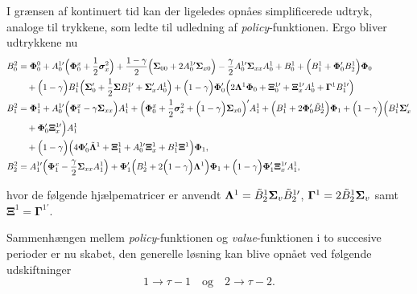 \documentclass[
  a4paper,
  oneside]{memoir}
\begin{document}
I grænsen af kontinuert tid kan der ligeledes opnåes simplificerede udtryk, analoge til trykkene, som ledte til udledning af \emph{policy}-funktionen. Ergo bliver udtrykkene nu
\begin{align*}
B_0^2&=\bm{\Phi}_0^0 + A_0^{1\prime} \Big(\bm{\Phi}_0^x + \frac{1}{2}\bm{\sigma}_x^2\Big) + \frac{1-\gamma}{2} \Big(\bm{\Sigma}_{00}+ 2A_0^{1\prime} \bm{\Sigma}_{x0}\Big) - \frac{\gamma}{2} A_0^{1\prime} \bm{\Sigma}_{xx} A_0^1 + B_0^1 + \Big(B_1^1 + \bm{\Phi}_0' B_2^1\Big) \bm{\Phi }_0\\
&\quad + \Big(1-\gamma\Big)B_1^1 \Big(\bm{\Sigma}_0' + \frac{1}{2} \bm{\Sigma} B_1^{1\prime} + \bm{\Sigma}_x' A_0^1\Big) + \Big(1-\gamma\Big) \bm{\Phi}_0' \Big(2\bm{\Lambda}^1 \bm{\Phi}_0 + \bm{\Xi}_0^{1\prime} + \bm{\Xi}_x^{1\prime} A_0^1 + \bm{\Gamma}^1 B_1^{1\prime}\Big)\\
B_1^2&=\bm{\Phi}_1^1 + A_0^{1\prime} \Big(\bm{\Phi}_1^x -\gamma\bm{\Sigma}_{xx}\Big) A_1^1 + \Big(\bm{\Phi}_0^x + \frac{1}{2}\bm{\sigma}_x^2 + \Big(1-\gamma\Big) \bm{\Sigma}_{x0}\Big)' A_1^1 + \Big(B_1^1 + 2\bm{\Phi}_0' \Tilde{B}_2^1\Big)\bm{\Phi}_1 + \Big(1-\gamma\Big) \Big(B_1^1\bm{\Sigma}_x'\\
&\quad + \bm{\Phi}_0' \bm{\Xi}_{x}^{1\prime}\Big) A_1^1\\
&\quad + \Big(1-\gamma\Big) \Big(4 \bm{\Phi}_0' \Tilde{\bm{\Lambda}}^1 + \bm{\Xi}_1^1 + A_0^{1\prime} \bm{\Xi}_x^1 + B_1^1 \bm{\Xi}^1\Big)\bm{\Phi}_1,\\
B_2^2&= A_1^{1\prime} \Big(\bm{\Phi}_1^x - \frac{\gamma}{2} \bm{\Sigma}_{xx} A_1^1\Big) + \bm{\Phi}_1' \Big(B_2^1 + 2\Big(1-\gamma\Big) \bm{\Lambda}^1\Big) \bm{\Phi}_1 + \Big(1-\gamma\Big) \bm{\Phi}_1' \bm{\Xi}_x^{1\prime} A_1^1,
\end{align*}

hvor de følgende hjælpematricer er anvendt \(\bm{\Lambda}^1=\Tilde{B}_2^{1}\bm{\Sigma}_v \Tilde{B}_2^{1\prime}\), \(\bm{\Gamma}^1=2\Tilde{B}_2^{1}\bm{\Sigma}_v\) samt \(\bm{\Xi}^1=\bm{\Gamma}^{1\prime}\).

Sammenhængen mellem \emph{policy}-funktionen og \emph{value}-funktionen i to succesive perioder er nu skabet, den generelle løsning kan blive opnået ved følgende udskiftninger
\begin{equation*}
1\to \tau-1\quad\text{og}\quad 2\to \tau-2.
\end{equation*}

\nocite{*}

  
\end{document}
